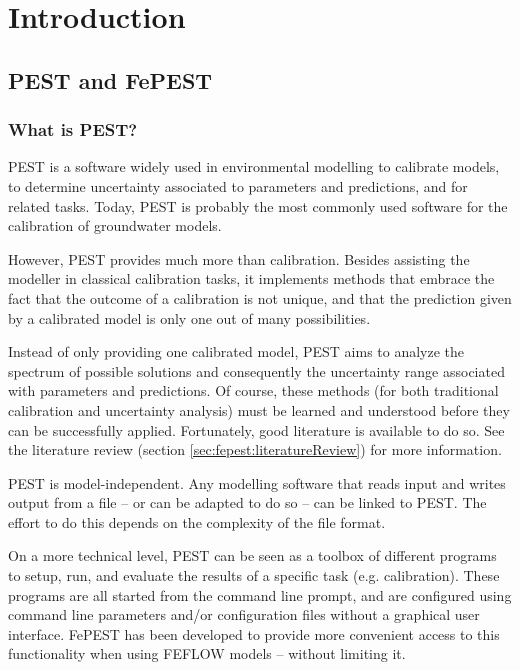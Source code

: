 \chapter{Introduction}

\section{PEST and FePEST}

\subsection{What is PEST?}

PEST is a software widely used in environmental modelling to calibrate models, to determine uncertainty associated to parameters and predictions, and for related tasks. Today, PEST is probably the most commonly used software for the calibration of groundwater models.

However, PEST provides much more than calibration. Besides assisting the modeller in classical calibration tasks, it implements methods that embrace the fact that the outcome of a calibration is not unique, and that the prediction given by a calibrated model is only one out of many possibilities.

Instead of only providing one calibrated model, PEST aims to analyze the spectrum of possible solutions and consequently the uncertainty range associated with parameters and predictions. Of course, these methods (for both traditional calibration and uncertainty analysis) must be learned and understood before they can be successfully applied. Fortunately, good literature is available to do so. See the literature review (section \ref{sec:fepest:literatureReview}) for more information.

PEST is model-independent. Any modelling software that reads input and writes output from a file – or can be adapted to do so – can be linked to PEST. The effort to do this depends on the complexity of the file format.

On a more technical level, PEST can be seen as a toolbox of different programs to setup, run, and evaluate the results of a specific task (e.g. calibration). These programs are all started from the command line prompt, and are configured using command line parameters and/or configuration files without a graphical user interface. FePEST has been developed to provide more convenient access to this functionality when using FEFLOW models – without limiting it. 

